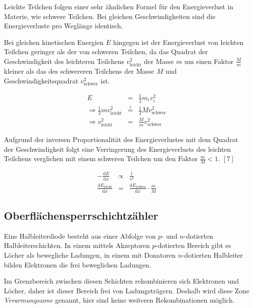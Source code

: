 \documentclass[12pt,a4paper]{scrartcl}
\numberwithin{equation}{section} %
\renewcommand{\[}{} %
\renewcommand{\]}{\noindent} %
\begin{document}
Leichte Teilchen folgen einer sehr ähnlichen Formel für den
Energieverlust in Materie, wie schwere Teilchen. Bei gleichen
Geschwindigkeiten sind die Energieverluste pro Weglänge identisch.

Bei gleichen kinetischen Energien \(E\) hingegen ist der Energieverlust
von leichten Teilchen geringer als der von schweren Teilchen, da das
Quadrat der Geschwindigkeit des leichteren Teilchens
\(v_\mathrm{leicht}^2\) der Masse \(m\) um einen Faktor \(\frac{M}{m}\)
kleiner als das des schwereren Teilchens der Masse \(M\) und
Geschwindigkeitsquadrat \(v_\mathrm{schwer}^2\) ist.

\[
\begin{eqnarray}
    E &=& \frac{1}{2}m_i v_i^2 \\
    \Rightarrow \frac{1}{2} m v_\mathrm{leicht}^2
        &\overset{!}{=}& \frac{1}{2} M v_\mathrm{schwer}^2 \\
    \Rightarrow v_\mathrm{leicht}^2 & = &\frac{M}{m} v_\mathrm{schwer}^2
\end{eqnarray}
\]

Aufgrund der inversen Proportionalität des Energieverlustes mit dem
Quadrat der Geschwindigkeit folgt eine Verringerung des Energieverlusts
des leichten Teilchens verglichen mit einem schweren Teilchen um den
Faktor \(\frac{m}{M} < 1\). \([7]\)

\[
\begin{eqnarray}
    - \frac{\mathrm dE}{\mathrm dx} &\propto& \frac{1}{v^2} \\
    \frac{\mathrm dE_\mathrm{leicht}}{\mathrm dx}
        &=& \frac{\mathrm dE_\mathrm{schwer}}{\mathrm dx}
            \cdot \frac{m}{M}
\end{eqnarray}
\]

\hypertarget{oberfluxe4chensperrschichtzuxe4hler}{%
\subsection{Oberflächensperrschichtzähler}\label{oberfluxe4chensperrschichtzuxe4hler}}

Eine Halbleiterdiode besteht aus einer Abfolge von \(p\)- und
\(n\)-dotierten Halbleiterschichten. In einem mittels Akzeptoren
\(p\)-dotierten Bereich gibt es Löcher als bewegliche Ladungen, in einem
mit Donatoren \(n\)-dotierten Halbleiter bilden Elektronen die frei
beweglichen Ladungen.

Im Grenzbereich zwischen diesen Schichten rekombinieren sich Elektronen
und Löcher, daher ist dieser Bereich frei von Ladungsträgern. Deshalb
wird diese Zone \emph{Verarmungszone} genannt, hier sind keine weiteren
Rekombinationen möglich.
\end{document}
